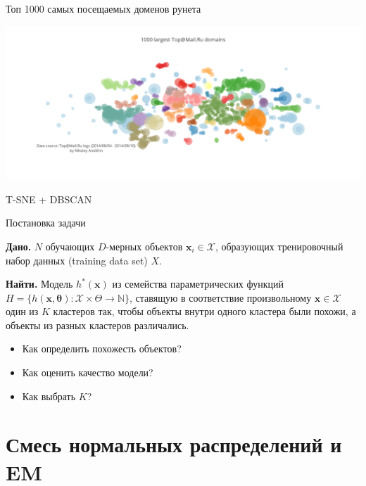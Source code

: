 \documentclass[10pt]{beamer}
\begin{document}
\begin{frame}{Топ 1000 самых посещаемых доменов рунета}

\begin{center}
\includegraphics[width=\textwidth]{images/domains.png}
\end{center}
T-SNE + DBSCAN

\end{frame}

\begin{frame}{Постановка задачи}

{\bf Дано.} $N$ обучающих $D$-мерных объектов $\mathbf{x}_i \in \mathcal{X}$, образующих тренировочный набор данных (training data set) $X$.

\vspace{1em}
{\bf Найти.} Модель $h^*(\mathbf{x})$ из семейства параметрических функций $H = \{h(\mathbf{x, \mathbf{\theta}}): \mathcal{X} \times \Theta \rightarrow \mathbb{N}\}$, ставящую в соответствие произвольному $\mathbf{x} \in \mathcal{X}$ один из $K$ кластеров так, чтобы объекты внутри одного кластера были похожи, а объекты из разных кластеров различались.

\vspace{1em}
\begin{itemize}
\item Как определить похожесть объектов?
\item Как оценить качество модели?
\item Как выбрать $K$?
\end{itemize}

\end{frame}

\section{Смесь нормальных распределений и EM}
\end{document}
